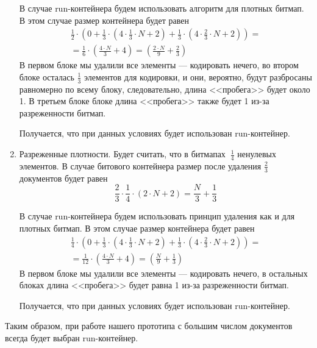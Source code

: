 \begin{enumerate}
    В случае run-контейнера будем использовать алгоритм для плотных битмап.
    В этом случае размер контейнера будет равен
    \begin{multline}
        \frac{1}{2} \cdot \left(0 +
            \frac{1}{3} \cdot \left(4 \cdot \frac{1}{3} \cdot N + 2\right) +
            \frac{1}{3} \cdot \left(4 \cdot \frac{2}{3} \cdot N + 2\right)
            \right) =\\
            = \frac{1}{6} \cdot \left(\frac{4 \cdot N}{3} + 4\right)
            = \left(\frac{2 \cdot N}{9} + \frac{2}{3}\right)
    \end{multline}
    В первом блоке мы удалили все элементы — кодировать нечего, во втором блоке
    осталась $\frac{1}{3}$ элементов для кодировки, и они, вероятно, будут
    разбросаны равномерно по всему блоку, следовательно, длина <<пробега>> будет около 1.
    В третьем блоке блоке длина <<пробега>> также будет 1 из-за разреженности битмап.

    Получается, что при данных условиях будет использован run-контейнер.

    \item Разреженные плотности. Будет считать, что в битмапах $~ \frac{1}{4}$
    ненулевых элементов. В случае битового контейнера размер после удаления
    $\frac{2}{3}$ документов будет равен
    \begin{equation}
        \frac{2}{3} \cdot \frac{1}{4} \cdot \left(2\cdot N + 2\right) = \frac{N}{3} + \frac{1}{3}
    \end{equation}

    В случае run-контейнера будем использовать принцип удаления как и для
    плотных битмап. В этом случае размер контейнера будет равен
    \begin{multline}
        \frac{1}{4} \cdot \left(0 +
            \frac{1}{3} \cdot \left(4 \cdot \frac{1}{3} \cdot N + 2\right) +
            \frac{1}{3} \cdot \left(4 \cdot \frac{2}{3} \cdot N + 2\right)
            \right) =\\
            = \frac{1}{12} \cdot \left(\frac{4 \cdot N}{3} + 4\right)
            = \left(\frac{N}{9} + \frac{1}{3}\right)
    \end{multline}
    В первом блоке мы удалили все элементы — кодировать нечего, в остальных блоках
    длина <<пробега>> будет равна 1 из-за разреженности битмап.

    Получается, что при данных условиях будет использован run-контейнер.
\end{enumerate}

Таким образом, при работе нашего прототипа с большим числом документов всегда
будет выбран run-контейнер.

